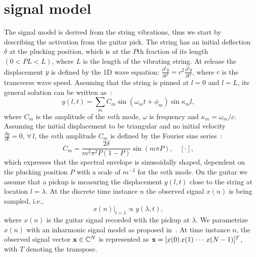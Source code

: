 
\section{signal model}
The signal model is derived from the string vibrations, thus we start by describing the activation from the guitar pick. 
%
The string has an initial deflection $\delta$ at the plucking position, which is at the $P$th fraction of its length $(0<PL<L)$, where $L$ is the length of the vibrating string. At release the displacement $y$ is defined by the 1D wave equation: %
$\frac{\partial^2y}{\partial t^2} = c^2\frac{\partial^2y}{\partial l^2}$,
%
where $c$ is the transverse wave speed. Assuming that the string is pinned at $l=0$ and $l=L$, its general solution can be written as~\cite{fletcher:physics_of_musical_instruments}:
%
\begin{equation}\label{eq:modalSum}
    y(l,t) = \sum_m C_m\sin(\omega_mt+\phi_m)\sin\kappa_ml,
\end{equation}
%
where $C_m$ is the amplitude of the $m$th mode, $\omega$ is frequency and $\kappa_m = \omega_m / c$. Assuming the initial displacement to be triangular and no initial velocity $\frac{\partial y}{\partial t} = 0, \, \forall\, l$, the $m$th amplitude $C_m$ is defined by the Fourier sine series~\cite{donkin:acoustics,fletcher:principles_of_vibration_and_sound}:
\begin{equation}
    C_m = \frac{2\delta}{m^2\pi^2P(1-P)}\sin(m\pi P), \quad [\cdot],
\end{equation}
which expresses that the spectral envelope is sinusoidally shaped, dependent on the plucking position $P$ with a scale of $m^{-2}$ for the $m$th mode.
%
\noindent
On the guitar we assume that a pickup is measuring the displacement $y(l,t)$ close to the string at location $l\!\!=\!\!\lambda$. At the discrete time instance $n$ the observed signal $x(n)$ is being sampled, i.e.,
\begin{equation}
     x(n)  \vert_{l=\lambda} \propto y(\lambda, t),
\end{equation}   
where $x(n)$ is the guitar signal recorded with the pickup at $\lambda$. We parametrize $x(n)$ with an inharmonic signal model as proposed in~\cite{hjerrild::icassp19}. 
%
 At time instance $n$, the observed signal vector $\mathbf x \in \mathbb{C}^N$ is represented as $\mathbf x = [x(0) \, x(1) \, \cdots \, x(N-1)]^T$, with $T$ denoting the transpose. %
